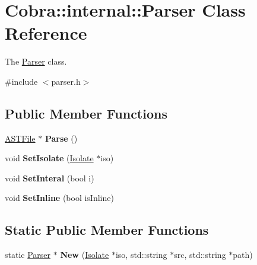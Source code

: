 \hypertarget{class_cobra_1_1internal_1_1_parser}{\section{Cobra\+:\+:internal\+:\+:Parser Class Reference}
\label{class_cobra_1_1internal_1_1_parser}
}


The \hyperlink{class_cobra_1_1internal_1_1_parser}{Parser} class.  




{\ttfamily \#include $<$parser.\+h$>$}

\subsection*{Public Member Functions}
\begin{DoxyCompactItemize}
\item 
\hypertarget{class_cobra_1_1internal_1_1_parser_a8051b75a9ac8860f4bed94e15a59058b}{\hyperlink{class_cobra_1_1internal_1_1_a_s_t_file}{A\+S\+T\+File} $\ast$ {\bfseries Parse} ()}\label{class_cobra_1_1internal_1_1_parser_a8051b75a9ac8860f4bed94e15a59058b}

\item 
\hypertarget{class_cobra_1_1internal_1_1_parser_a91dbe127c7b13d0a81af987b65da3730}{void {\bfseries Set\+Isolate} (\hyperlink{class_cobra_1_1internal_1_1_isolate}{Isolate} $\ast$iso)}\label{class_cobra_1_1internal_1_1_parser_a91dbe127c7b13d0a81af987b65da3730}

\item 
\hypertarget{class_cobra_1_1internal_1_1_parser_a47b2c0bb11cb3833a5633fe53a14c121}{void {\bfseries Set\+Interal} (bool i)}\label{class_cobra_1_1internal_1_1_parser_a47b2c0bb11cb3833a5633fe53a14c121}

\item 
\hypertarget{class_cobra_1_1internal_1_1_parser_ae82eea2bf641ebc5a83d2fca9bb54cf9}{void {\bfseries Set\+Inline} (bool is\+Inline)}\label{class_cobra_1_1internal_1_1_parser_ae82eea2bf641ebc5a83d2fca9bb54cf9}

\end{DoxyCompactItemize}
\subsection*{Static Public Member Functions}
\begin{DoxyCompactItemize}
\item 
\hypertarget{class_cobra_1_1internal_1_1_parser_aba8b950c2cf05a7e68b40d6bdfb27da6}{static \hyperlink{class_cobra_1_1internal_1_1_parser}{Parser} $\ast$ {\bfseries New} (\hyperlink{class_cobra_1_1internal_1_1_isolate}{Isolate} $\ast$iso, std\+::string $\ast$src, std\+::string $\ast$path)}\label{class_cobra_1_1internal_1_1_parser_aba8b950c2cf05a7e68b40d6bdfb27da6}

\end{DoxyCompactItemize}
